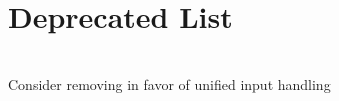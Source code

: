 \chapter{Deprecated List}
\hypertarget{deprecated}{}\label{deprecated}

\begin{DoxyRefList}
\item[Member \doxylink{class_pause_state_ae2ac63e9931e0a3382f7b1f77c13e1f7}{Pause\+State\+::Check\+Pause} (const Game\+Timer \&gt)]\hfill \\
\label{deprecated__deprecated000001}%
%
Consider removing in favor of unified input handling 
\end{DoxyRefList}